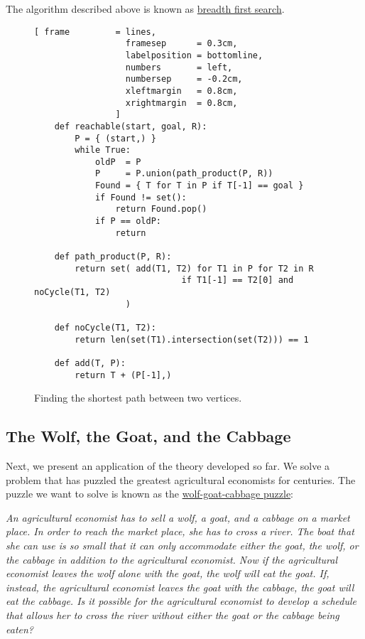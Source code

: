 \remarkEng
The algorithm described above is known as 
\href{https://en.wikipedia.org/wiki/Breadth-first_search}{breadth first search}. \eox 

\begin{figure}[!ht]
  \centering
\begin{Verbatim}[ frame         = lines, 
                  framesep      = 0.3cm, 
                  labelposition = bottomline,
                  numbers       = left,
                  numbersep     = -0.2cm,
                  xleftmargin   = 0.8cm,
                  xrightmargin  = 0.8cm,
                ]
    def reachable(start, goal, R):
        P = { (start,) }
        while True:
            oldP  = P
            P     = P.union(path_product(P, R))
            Found = { T for T in P if T[-1] == goal }
            if Found != set():
                return Found.pop()
            if P == oldP:
                return
                
    def path_product(P, R):
        return set( add(T1, T2) for T1 in P for T2 in R
                             if T1[-1] == T2[0] and noCycle(T1, T2)
                  )
    
    def noCycle(T1, T2):
        return len(set(T1).intersection(set(T2))) == 1
    
    def add(T, P):
        return T + (P[-1],)
\end{Verbatim} 
\vspace*{-0.3cm}
\caption{Finding the shortest path between two vertices.}  
\label{fig:find_path.py}
\end{figure}

\subsection{The Wolf, the Goat, and the Cabbage}
Next, we present an application of the theory developed so far.  We solve a problem that has puzzled
the greatest agricultural economists for centuries.  The puzzle we want to solve is known as the 
\href{http://jeux.lulu.pagesperso-orange.fr/html/anglais/loupChe/loupChe1.htm}{wolf-goat-cabbage puzzle}:  
\vspace*{0.3cm}

\begin{minipage}[c]{16cm}
{\sl
An agricultural economist has to sell a wolf, a goat, and a cabbage on a market place.  In order to
reach the market place, she has to cross a river.  The boat that she can use is so small that it can
only accommodate either the goat, the wolf, or the cabbage in addition to the agricultural economist.
Now if the agricultural economist leaves the wolf alone with the goat, the wolf will eat the goat.
If, instead, the agricultural economist leaves the goat with the cabbage, the goat will eat the cabbage.
Is it possible for the agricultural economist to develop a schedule that allows her to cross the river
without either the goat or the cabbage being eaten?
}
\end{minipage}
\vspace*{0.3cm}


